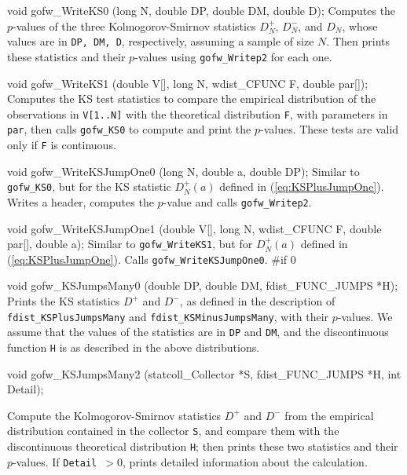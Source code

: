 void gofw_WriteKS0 (long N, double DP, double DM, double D);
\endcode
\tab  Computes the $p$-values of the three Kolmogorov-Smirnov statistics
  $D_N^+$, $D_N^-$, and $D_N$, whose values are in {\tt DP, DM, D},
  respectively, assuming a sample of size $N$.
  Then prints these statistics and their $p$-values 
  using {\tt gofw\_Writep2} for each one.
\endtab
\code


void gofw_WriteKS1 (double V[], long N, wdist_CFUNC F, double par[]);
\endcode
\tab Computes the KS test statistics to compare the
 empirical distribution of the observations in {\tt V[1..N]} 
 with the theoretical distribution {\tt F}, with parameters in {\tt par},
 then calls {\tt gofw\_KS0} to compute and print the $p$-values.
 These tests are valid only if {\tt F} is continuous.
\endtab
\code


void gofw_WriteKSJumpOne0 (long N, double a, double DP);
\endcode
\tab  Similar to {\tt gofw\_KS0}, but for the KS statistic $D_N^+(a)$
  defined in (\ref{eq:KSPlusJumpOne}).  Writes a header,
  computes the $p$-value and calls {\tt gofw\_Writep2}.
\endtab
\code


void gofw_WriteKSJumpOne1 (double V[], long N, 
                           wdist_CFUNC F, double par[], double a);
\endcode
\tab Similar to {\tt gofw\_WriteKS1}, but for $D_N^+(a)$ 
  defined in (\ref{eq:KSPlusJumpOne}). 
  Calls {\tt gofw\_WriteKSJumpOne0}.
\endtab
\iffalse %
\code
#if 0

void gofw_KSJumpsMany0 (double DP, double DM, fdist_FUNC_JUMPS *H);
\endcode
\tab
  Prints the KS  statistics  $D^+$ and $D^-$, as defined in the
  description of {\tt fdist\_KSPlusJumpsMany} and 
  {\tt fdist\_KSMinusJumpsMany}, with their $p$-values.
  We assume that the values of the statistics are in {\tt DP} and {\tt DM},
  and the discontinuous function {\tt H} is as described in the
  above distributions.
\endtab
\code


void gofw_KSJumpsMany2 (statcoll_Collector *S, fdist_FUNC_JUMPS *H,
                        int Detail);

\endcode
\tab
 Compute the Kolmogorov-Smirnov statistics  $D^+$ and $D^-$
 from the empirical distribution contained in the collector  {\tt S},
  and  compare them with the discontinuous theoretical distribution
 {\tt H}; then prints these two statistics and their $p$-values.
 If  {\tt Detail $> 0$}, prints detailed information
 about the calculation.
\endtab
\code

